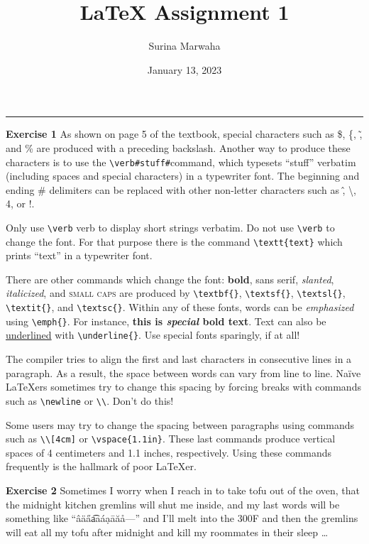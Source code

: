 \documentclass[11pt,oneside,letterpaper]{article}
\title{\LaTeX{} Assignment 1}
\date{January 13, 2023}
\author{Surina Marwaha}
\begin{document}
\pagestyle{plain}
\maketitle

\begin{center}
	\rule{33eM}{0.2ex}
\end{center}

\noindent\textbf{Exercise 1}
\newline\newline
As shown on page 5 of the textbook, special characters such as \$, \{, \~, and \% are produced with a preceding backslash. Another way to produce these characters is to use the \verb+\verb#stuff#+command, which typesets ``stuff'' verbatim (including spaces and special characters) in a typewriter font. The beginning and ending \# delimiters can be replaced with other non-letter characters such as \^, \textbackslash, 4, or !.

Only use \verb+\verb+ verb to display short strings verbatim. Do not use \verb+\verb+ to change the font. For that purpose there is the command \verb+\textt{text}+ which prints ``text'' in a typewriter font.

There are other commands which change the font: \textbf{bold}, \textsf{sans serif}, \textsl{slanted}, \textit{italicized}, and \textsc{small caps} are produced by \verb+\textbf{}+, \verb+\textsf{}+, \verb+\textsl{}+,
\verb+\textit{}+, and \verb+\textsc{}+. Within any of these fonts, words can be \emph{emphasized}
using \verb+\emph{}+. For instance, \textbf{this is \textit{special} bold text}. Text can also be
\underline{underlined} with \verb+\underline{}+. Use special fonts sparingly, if at all!

The compiler tries to align the first and last characters in consecutive lines in a paragraph. As a result, the space between words can vary from line to line. Naïve \LaTeX{}ers sometimes try to change this spacing by forcing breaks
with commands such as \verb+\newline+ or \verb+\\+. Don’t do this! 

Some users may try to change the spacing between paragraphs using commands such as \verb+\\[4cm]+ or \verb+\vspace{1.1in}+. These last commands produce vertical spaces of 4 centimeters and 1.1 inches, respectively. Using these commands frequently is the hallmark of poor \LaTeX{}er.

\newpage

\noindent\textbf{Exercise 2}
\newline\newline
Sometimes I worry when I reach in to take tofu out of the oven, that the midnight kitchen gremlins will shut me inside, and my last words will be something like ``\^a\"a\H a\t aa\'a\d a\=a\u a\aa ---'' and I'll melt into the 300\textdegree{}F and then the gremlins will eat all my tofu after midnight and kill my roommates in their sleep \ldots
\end{document}

